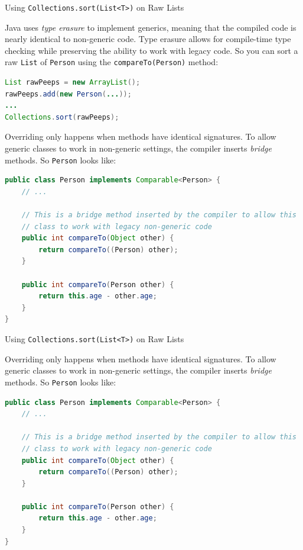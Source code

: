 \documentclass{beamer}
\begin{document}
\begin{frame}[fragile]{Using {\tt Collections.sort(List<T>)} on Raw Lists}

Java uses {\it type erasure} to implement generics, meaning that the compiled code is nearly identical to non-generic code.  Type erasure allows for compile-time type checking while preserving the ability to work with legacy code.  So you can sort a raw {\tt List} of {\tt Person} using the {\tt compareTo(Person)} method:

\begin{lstlisting}[language=Java]
List rawPeeps = new ArrayList();
rawPeeps.add(new Person(...));
...
Collections.sort(rawPeeps);
\end{lstlisting}

Overriding only happens when methods have identical signatures.  To allow generic classes to work in non-generic settings, the compiler inserts {\it bridge} methods.  So {\tt Person} looks like:

\begin{lstlisting}[language=Java]
public class Person implements Comparable<Person> {
    // ...

    // This is a bridge method inserted by the compiler to allow this
    // class to work with legacy non-generic code
    public int compareTo(Object other) {
        return compareTo((Person) other);
    }

    public int compareTo(Person other) {
        return this.age - other.age;
    }
}
\end{lstlisting}

\end{frame}

\begin{frame}[fragile]{Using {\tt Collections.sort(List<T>)} on Raw Lists}

Overriding only happens when methods have identical signatures.  To allow generic classes to work in non-generic settings, the compiler inserts {\it bridge} methods.  So {\tt Person} looks like:

\begin{lstlisting}[language=Java]
public class Person implements Comparable<Person> {
    // ...

    // This is a bridge method inserted by the compiler to allow this
    // class to work with legacy non-generic code
    public int compareTo(Object other) {
        return compareTo((Person) other);
    }

    public int compareTo(Person other) {
        return this.age - other.age;
    }
}
\end{lstlisting}

\end{frame}
\end{document}

